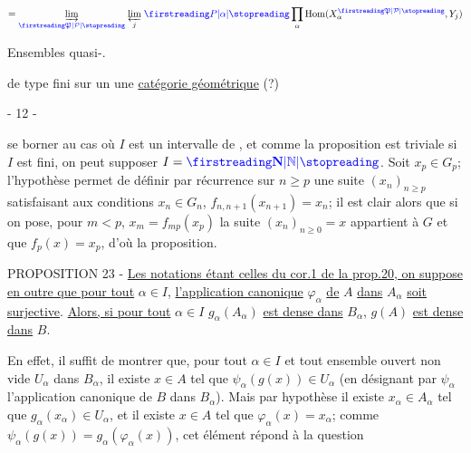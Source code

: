 \[
=\underset{\unsure{\mathfrak P|\mathcal P}}{\varinjlim}\;\underset{j}{\varprojlim}\;\deleted{\unsure{P|\alpha}}\prod_{\alpha}\operatorname{Hom}(X_{\alpha}^{\unsure{\mathfrak P|\mathcal P}},Y_j)
\]


Ensembles quasi-.

  de type fini sur un
   \uline{}
 une \uline{catégorie géométrique} (?)


\begin{center}- 12 -\end{center}

se borner au cas où $I$ est un intervalle de \qquad, et comme la proposition est triviale si $I$ est fini, on peut supposer $I=\unsure{\mathbf N|\mathbb N}$. Soit $x_p\in G_p$; l'hypothèse permet de définir par récurrence sur $n\geq p$ une suite $(x_n)_{n\geq p}$ satisfaisant aux conditions $x_n\in G_n$, $f_{n,n+1}(x_{n+1})=x_n$; il est clair alors que si on pose, pour $m<p$, $x_m=f_{mp}(x_p)$ la suite $(x_n)_{n\geq0}=x$ appartient à $G$ et que $f_p(x)=x_p$, d'où la proposition.

PROPOSITION 23 - \uline{Les notations étant celles du cor.1 de la prop.20, on suppose en outre que pour tout} $\alpha\in I$, \uline{l'application canonique} $\varphi_\alpha$ \uline{de} $A$ \uline{dans} $A_\alpha$ \uline{soit surjective}. \uline{Alors, si pour tout} $\alpha\in I$ $g_\alpha(A_\alpha)$ \uline{est dense dans} $B_\alpha$, $g(A)$ \uline{est dense dans} $B$.

En effet, il suffit de montrer que, pour tout $\alpha\in I$ et tout ensemble ouvert non vide $U_\alpha$ dans $B_\alpha$, il existe $x\in A$ tel que $\psi_\alpha(g(x))\in U_\alpha$ (en désignant par $\psi_\alpha$ l'application canonique de $B$ dans $B_\alpha$). Mais par hypothèse il existe $x_\alpha\in A_\alpha$ tel que $g_\alpha(x_\alpha)\in U_\alpha$, et il existe $x\in A$ tel que $\varphi_\alpha(x)=x_\alpha$; comme $\psi_\alpha(g(x))=g_\alpha(\varphi_\alpha(x))$, cet élément répond à la question

